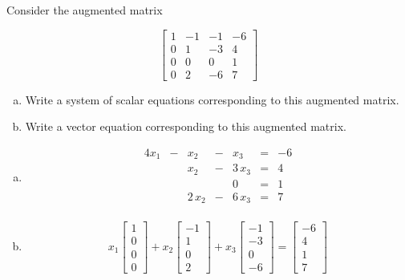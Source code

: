 
\begin{exerciseStatement}


 Consider the augmented matrix 

\[ \left[\begin{array}{ccc|c}
1 & -1 & -1 & -6 \\
0 & 1 & -3 & 4 \\
0 & 0 & 0 & 1 \\
0 & 2 & -6 & 7
\end{array}\right] \]
\begin{enumerate}[(a)]
\item  Write a system of scalar equations corresponding to this augmented matrix. 
\item  Write a vector equation corresponding to this augmented matrix. 
\end{enumerate}
    
\end{exerciseStatement}
    
\begin{exerciseAnswer} 

\begin{enumerate}[(a)]
\item 
\begin{alignat*}{4} x_{1} &-& x_{2} &-& x_{3} &=& -6 \\ & & x_{2} &-& 3 \, x_{3} &=& 4 \\ & &  & & 0 &=& 1 \\ & & 2 \, x_{2} &-& 6 \, x_{3} &=& 7 \\ \end{alignat*}
            
\item \[ x_{1} \left[\begin{array}{c}
1 \\
0 \\
0 \\
0
\end{array}\right] + x_{2} \left[\begin{array}{c}
-1 \\
1 \\
0 \\
2
\end{array}\right] + x_{3} \left[\begin{array}{c}
-1 \\
-3 \\
0 \\
-6
\end{array}\right] = \left[\begin{array}{c}
-6 \\
4 \\
1 \\
7
\end{array}\right] \]
\end{enumerate}
    
\end{exerciseAnswer}
    
